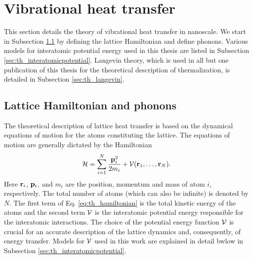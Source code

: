 
\iffalse

\section{Vibrational heat transfer}
\label{sec:th_vibtheory}

This section details the theory of vibrational heat transfer in nanoscale. We start in Subsection \ref{sec:th_phonons} by defining the lattice Hamiltonian and define phonons. Various models for interatomic potential energy used in this thesis are listed in Subsection \ref{sec:th_interatomicpotential}. Langevin theory, which is used in all but one publication of this thesis for the theoretical description of thermalization, is detailed in Subsection \ref{sec:th_langevin}.

\subsection{Lattice Hamiltonian and phonons}
\label{sec:th_phonons}

The theoretical description of lattice heat transfer is based on the dynamical equations of motion for the atoms constituting the lattice. The equations of motion are generally dictated by the Hamiltonian \cite{ziman}
\begin{equation}
 \mathcal{H} = \sum_{i=1}^N \frac{\mathbf{p}_i^2}{2m_i} + \mathcal{V}(\mathbf{r}_1,\dots,\mathbf{r}_N). \label{eq:th_hamiltonian}
\end{equation}
Here $\mathbf{r}_i$, $\mathbf{p}_i$, and $m_i$ are the position, momentum and mass of atom $i$, respectively. The total number of atoms (which can also be infinite) is denoted by $N$. The first term of Eq. \eqref{eq:th_hamiltonian} is the total kinetic energy of the atoms and the second term $\mathcal{V}$ is the interatomic potential energy responsible for the interatomic interactions. The choice of the potential energy function $\mathcal{V}$ is crucial for an accurate description of the lattice dynamics and, consequently, of energy transfer. Models for $\mathcal{V}$ used in this work are explained in detail bwlow in Subsection \ref{sec:th_interatomicpotential}.

